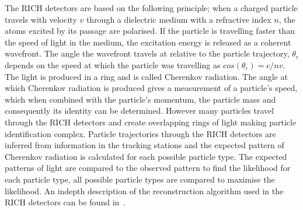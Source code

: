 The RICH detectors are based on the following principle; when a charged particle travels with velocity $v$ through a dielectric medium with a refractive index $n$, the atoms excited by its passage are polarised. If the particle is travelling faster than the speed of light in the medium, the excitation energy is released as a coherent wavefront. The angle the wavefront travels at relative to the particle trajectory, $\theta_{c}$ depends on the speed at which the particle was travelling as $cos(\theta_{c}) = c/nv$. The light is produced in a ring and is called Cherenkov radiation. %
The angle at which Cherenkov radiation is produced gives a measurement of a particle’s speed, which when combined with the particle’s momentum, the particle mass and consequently its identity can be determined. However many particles travel through the RICH detectors and create overlapping rings of light making particle identification complex. Particle trajectories through the RICH detectors are inferred from information in the tracking stations and the expected pattern of Cherenkov radiation is calculated for each possible particle type. The expected patterns of light are compared to the observed pattern to find the likelihood for each particle type, all possible particle types are compared to maximise the likelihood. An indepth description of the reconstruction algorithm used in the RICH detectors can be found in~\cite{Forty:684714}. 


